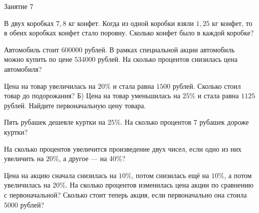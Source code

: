 \begin{class}[number=7]
	\begin{listofex}
		\item Занятие 7
	\end{listofex}
\end{class}

\begin{homework}[number=1]
	\begin{listofex}
		\item В двух коробках \(7,8\) кг конфет. Когда из одной коробки взяли \(1,25\) кг конфет, то в обеих коробках конфет стало поровну. Сколько конфет было в каждой коробке?
		\item Автомобиль стоит \(600000\) рублей. В рамках специальной акции автомобиль можно купить по цене \(534000\) рублей. На сколько процентов снизилась цена автомобиля?
		\item Цена на товар увеличилась на \(20\%\) и стала равна \(1500\) рублей. Сколько стоил товар до подорожания? Б) Цена на товар уменьшилась на \(25\%\) и стала равна \(1125\) рублей. Найдите первоначальную цену товара.
		\item Пять рубашек дешевле куртки на \(25\%\). На сколько процентов \(7\) рубашек дороже куртки?
		\item На сколько процентов увеличится произведение двух чисел, если одно из них увеличить на \(20\%\), а другое --- на 40\%?
		\item Цена на акцию сначала снизилась на \(10\%\), потом снизилась ещё на \(10\%\), а потом увеличилась на \(20\%\). На сколько процентов изменилась цена акции по сравнению с первоначальной? Сколько стоит теперь акция, если первоначально она стоила \(5000\) рублей?
	\end{listofex}
\end{homework}

